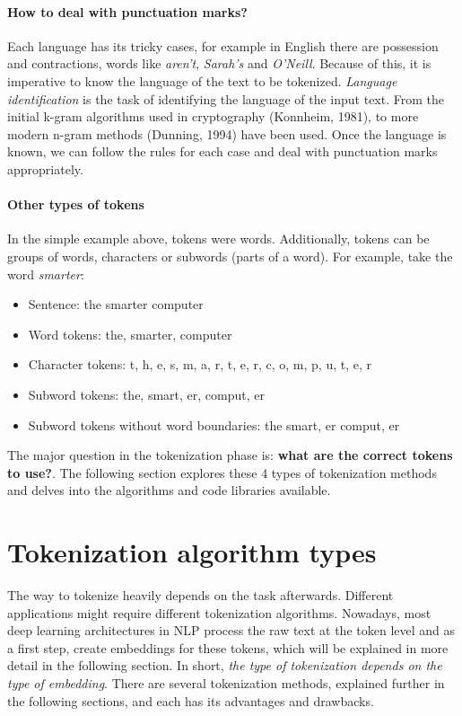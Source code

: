 \paragraph{How to deal with punctuation marks?}

Each language has its tricky cases, for example in English there are possession and contractions, words like \emph{aren't}, \emph{Sarah's} and \emph{O'Neill}. Because of this, it is imperative to know the language of the text to be tokenized. \textit{Language identification} is the task of identifying the language of the input text. From the initial k-gram algorithms used in cryptography (Konnheim, 1981), to more modern n-gram methods (Dunning, 1994) have been used. Once the language is known, we can follow the rules for each case and deal with punctuation marks appropriately.

\paragraph{Other types of tokens}

In the simple example above, tokens were words. Additionally, tokens can be groups of words, characters or subwords (parts of a word). For example, take the word \emph{smarter}:

\begin{itemize}
    \item Sentence: the smarter computer
    \item Word tokens: the, smarter, computer
    \item Character tokens: t, h, e, s, m, a, r, t, e, r, c, o, m, p, u, t, e, r
    \item Subword tokens: the, smart, er, comput, er
    \item Subword tokens without word boundaries: the smart, er comput, er
\end{itemize}

The major question in the tokenization phase is: \textbf{what are the correct tokens to use?}. The following section explores these 4 types of tokenization methods and delves into the algorithms and code libraries available.

\section{Tokenization algorithm types}

The way to tokenize heavily depends on the task afterwards. Different applications might require different tokenization algorithms. Nowadays, most deep learning architectures in NLP process the raw text at the token level and as a first step, create embeddings for these tokens, which will be explained in more detail in the following section. In short, \textit{the type of tokenization depends on the type of embedding}. There are several tokenization methods, explained further in the following sections, and each has its advantages and drawbacks.

